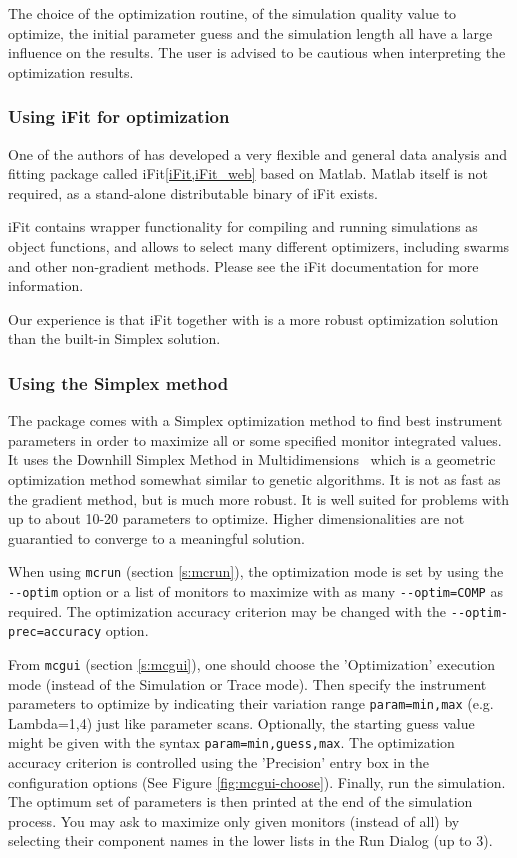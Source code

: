 The choice of the optimization routine, of the simulation quality value to
optimize, the initial parameter guess and the simulation length all have a large
influence on the results.  The user is advised to be cautious when interpreting
the optimization results.

\subsubsection{Using iFit for optimization}

One of the authors of \MCS has developed a very flexible and general data
analysis and fitting package called iFit\ref{iFit,iFit_web} based on
Matlab. Matlab itself is not required, as a stand-alone distributable binary of
iFit exists.

iFit contains wrapper functionality for compiling and running \MCS simulations
as object functions, and allows to select many different optimizers, including
swarms and other non-gradient methods. Please see the iFit documentation for
more information.

Our experience is that iFit together with \MCS is a more robust optimization
solution than the \MCS built-in Simplex solution.

\subsubsection{Using the Simplex method}

The \MCS package comes with a Simplex optimization method to find best
instrument parameters in order to maximize all or some specified monitor
integrated values. It uses the Downhill Simplex Method in
Multidimensions~\cite{neldermead,NumRecip} which is a geometric optimization
method somewhat similar to genetic algorithms. It is not as fast as the gradient
method, but is much more robust. It is well suited for problems with up to about
10-20 parameters to optimize. Higher dimensionalities are not guarantied to
converge to a meaningful solution.

When using \verb+mcrun+ (section \ref{s:mcrun}), the optimization mode is set by
using the \verb+--optim+ option or a list of monitors to maximize with as many
\verb+--optim=COMP+ as required. The optimization accuracy criterion may be
changed with the \verb+--optim-prec=accuracy+ option.

From \verb+mcgui+ (section \ref{s:mcgui}), one should choose the 'Optimization'
execution mode (instead of the Simulation or Trace mode). Then specify the
instrument parameters to optimize by indicating their variation range
\verb+param=min,max+ (e.g. Lambda=1,4) just like parameter scans. Optionally,
the starting guess value might be given with the syntax
\verb+param=min,guess,max+. The optimization accuracy criterion is controlled
using the 'Precision' entry box in the configuration options (See Figure
\ref{fig:mcgui-choose}). Finally, run the simulation. The optimum set of
parameters is then printed at the end of the simulation process. You may ask to
maximize only given monitors (instead of all) by selecting their component names
in the lower lists in the Run Dialog (up to 3).

